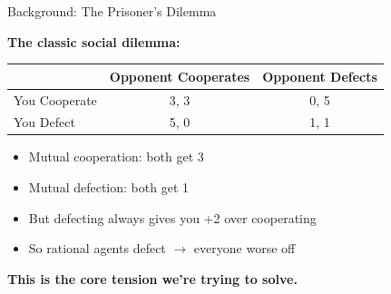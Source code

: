 \documentclass[aspectratio=169]{beamer}
\begin{document}


\begin{frame}{Background: The Prisoner's Dilemma}
  
  \textbf{The classic social dilemma:}
  
  \vspace{0.5em}
  \begin{table}
    \centering
    \begin{tabular}{l|cc}
      & Opponent Cooperates & Opponent Defects \\
      \hline
      You Cooperate & 3, 3 & 0, 5 \\
      You Defect & 5, 0 & 1, 1 \\
    \end{tabular}
  \end{table}
  
  \vspace{1em}
  \begin{itemize}
    \item Mutual cooperation: both get 3
    \item Mutual defection: both get 1
    \item But defecting always gives you +2 over cooperating
    \item So rational agents defect $\to$ everyone worse off
  \end{itemize}
  
  \vspace{0.5em}
  \textbf{This is the core tension we're trying to solve.}

\end{frame}

\end{document}
